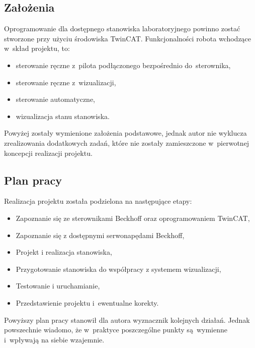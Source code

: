 \subsection{Założenia}
Oprogramowanie dla dostępnego stanowiska laboratoryjnego powinno zostać stworzone przy użyciu środowiska TwinCAT. Funkcjonalności robota wchodzące w~skład projektu, to:
\begin{itemize}
\item sterowanie ręczne z~pilota podłączonego bezpośrednio do~sterownika,
\item sterowanie ręczne z~wizualizacji,
\item sterowanie automatyczne, 
\item wizualizacja stanu stanowiska.
\end{itemize}
\indent
\indent Powyżej zostały wymienione założenia podstawowe, jednak autor nie wyklucza zrealizowania dodatkowych zadań, które nie zostały zamieszczone w~pierwotnej koncepcji realizacji projektu.

\subsection{Plan pracy}
Realizacja projektu została podzielona na następujące etapy:
\begin{itemize}
\item Zapoznanie się ze sterownikami Beckhoff oraz oprogramowaniem TwinCAT,
\item Zapoznanie się z dostępnymi serwonapędami Beckhoff,
\item Projekt i realizacja stanowiska,
\item Przygotowanie stanowiska do współpracy z systemem wizualizacji,
\item Testowanie i uruchamianie,
\item Przedstawienie projektu i~ewentualne korekty.
\end{itemize}
\indent
\indent Powyższy plan pracy stanowił dla autora wyznacznik kolejnych działań. Jednak powszechnie wiadomo, że w~praktyce poszczególne punkty są~wymienne i~wpływają na siebie wzajemnie.
